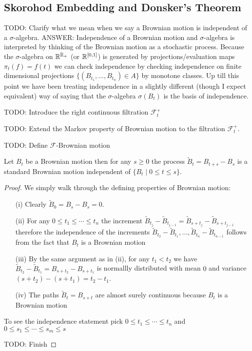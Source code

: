 \subsection{Skorohod Embedding and Donsker's Theorem}
TODO: Clarify what we mean when we say a Brownian motion is
independent of a $\sigma$-algebra.  ANSWER: Independence of a Brownian
motion and $\sigma$-algebra is interpreted by thinking of the Brownian
motion as a stochastic process.  Because the $\sigma$-algebra on
$\mathbb{R}^{\mathbb{R}_+}$ (or $\mathbb{R}^{[0,1]}$) is generated by
projections/evaluation maps $\pi_t(f) = f(t)$ we can check
independence by checking independence on finite dimensional
projections $\lbrace (B_{t_1}, \dotsc, B_{t_n}) \in A \rbrace$ by
monotone classes.  Up till this point we have been treating
independence in a slightly different (though I expect equivalent) way
of saying that the $\sigma$-algebra $\sigma(B_t)$ is the basis of independence.

TODO: Introduce the right continuous filtration $\mathcal{F}^+_t$

TODO: Extend the Markov property of Brownian motion to the filtration $\mathcal{F}^+_t$.

TODO: Define $\mathcal{F}$-Brownian motion

\begin{thm}\label{MarkovPropertyBrownianMotion}Let $B_t$ be a
  Brownian motion then for any $s \geq 0$ the process $\tilde{B}_t = B_{t + s} -
  B_s$ is a standard Brownian motion independent of $\lbrace B_t \mid
  0 \leq t \leq s \rbrace$.
\end{thm}
\begin{proof}
We simply walk through the defining properties of Brownian motion:
\begin{itemize}
\item[(i)] Clearly $\tilde{B}_0 = B_s - B_s = 0$.
\item[(ii)] For any $0 \leq t_1 \leq \cdots \leq t_n$ the increment
  $\tilde{B}_{t_j} - \tilde{B}_{t_{j-1}} = \tilde{B}_{s+ t_j} - \tilde{B}_{s+ t_{j-1}}$
  therefore the independence of the increments $\tilde{B}_{t_2} -
  \tilde{B}_{t_1}, \dotsc, \tilde{B}_{t_n} - \tilde{B}_{t_{n-1}}$ follows from the fact
  that $B_t$ is a Brownian motion
\item[(iii)]By the same argument as in (ii), for any $t_1 < t_2$ we
  have $\tilde{B}_{t_2} -  \tilde{B}_{t_1} = B_{s+t_2} -  B_{s+t_1}$ is normallly
  distributed with mean $0$ and variance $(s + t_2) - (s+t_1) = t_2 -
  t_1$.
\item[(iv)]The paths $\tilde{B}_t = B_{s+t}$ are almost surely continuous
  because $B_t$ is a Brownian motion
\end{itemize}

To see the independence statement pick $0 \leq t_1 \leq \cdots \leq
t_n$ and $0 \leq s_1 \leq \cdots \leq s_m \leq s$ 

TODO: Finish
\end{proof}

